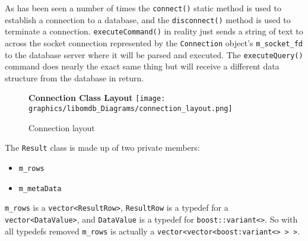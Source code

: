\documentclass[letterpaper, 12pt]{article}
\renewcommand{\includegraphics}[2][]{\fbox{}}
\begin{document}
  As has been seen a number of times the \lstinline[basicstyle=\ttfamily]|connect()| 
  static method is used  to establish a connection to a database, and the 
  \lstinline[basicstyle=\ttfamily]|disconnect()| method is used to terminate a connection.
  \lstinline[basicstyle=\ttfamily]|executeCommand()| in reality just sends a string of
  text to across the socket connection represented by the 
  \lstinline[basicstyle=\ttfamily]|Connection| object's 
  \lstinline[basicstyle=\ttfamily]|m_socket_fd| to the database server where it will be 
  parsed and executed. The \lstinline[basicstyle=\ttfamily]|executeQuery()| command
  does nearly the exact same thing but will receive a different data structure from the 
  database in return.
  
  \begin{figure}
    \centering
    \textbf{Connection Class Layout}
    \texttt{[image: graphics/libomdb\_Diagrams/connection\_layout.png]}
	\caption{Connection layout}    
  \end{figure}
  \par\vspace{\baselineskip}
  
  The \lstinline[basicstyle=\ttfamily]|Result| class is made up of two private members:
  \begin{itemize}
    \item \lstinline[basicstyle=\ttfamily]|m_rows|
    \item \lstinline[basicstyle=\ttfamily]|m_metaData|
  \end{itemize}
  \lstinline[basicstyle=\ttfamily]|m_rows| is a
  \lstinline[basicstyle=\ttfamily]|vector<ResultRow>|, 
  \lstinline[basicstyle=\ttfamily]|ResultRow| is a typedef for
  a \lstinline[basicstyle=\ttfamily]|vector<DataValue>|, and 
  \lstinline[basicstyle=\ttfamily]|DataValue| is a typedef for 
  \lstinline[basicstyle=\ttfamily]|boost::variant<>|.
  So with all typedefs removed \lstinline[basicstyle=\ttfamily]|m_rows| is
  actually a
  \lstinline[basicstyle=\ttfamily]|vector<vector<boost:variant<> > >|.
  
\end{document}

